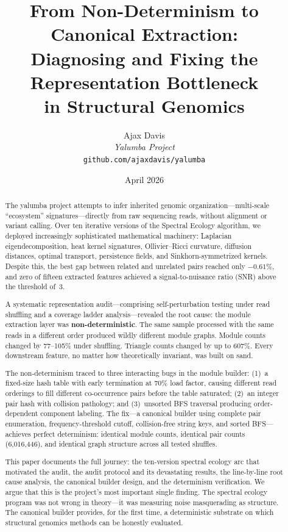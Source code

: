 \documentclass{../yalumba}
\title{From Non-Determinism to Canonical Extraction:\\[0.3em]
Diagnosing and Fixing the Representation Bottleneck\\[0.2em]
in Structural Genomics}
\author{%
  Ajax Davis\\[0.3em]
  \normalsize\textit{Yalumba Project}\\[0.2em]
  \normalsize\texttt{github.com/ajaxdavis/yalumba}%
}
\date{April 2026}
\begin{document}
\maketitle
\thispagestyle{empty}

\begin{abstract}
\noindent
The yalumba project attempts to infer inherited genomic organization---multi-scale
``ecosystem'' signatures---directly from raw sequencing reads, without alignment
or variant calling. Over ten iterative versions of the Spectral Ecology algorithm,
we deployed increasingly sophisticated mathematical machinery: Laplacian
eigendecomposition, heat kernel signatures, Ollivier--Ricci curvature, diffusion
distances, optimal transport, persistence fields, and Sinkhorn-symmetrized kernels.
Despite this, the best gap between related and unrelated pairs reached only
$-0.61\%$, and zero of fifteen extracted features achieved a signal-to-nuisance
ratio (SNR) above the threshold of~3.

A systematic representation audit---comprising self-perturbation testing under
read shuffling and a coverage ladder analysis---revealed the root cause: the
module extraction layer was \textbf{non-deterministic}. The same sample processed
with the same reads in a different order produced wildly different module graphs.
Module counts changed by 77--105\% under shuffling. Triangle counts changed by
up to 607\%. Every downstream feature, no matter how theoretically invariant,
was built on sand.

The non-determinism traced to three interacting bugs in the module builder:
(1)~a fixed-size hash table with early termination at 70\% load factor, causing
different read orderings to fill different co-occurrence pairs before the table
saturated; (2)~an integer pair hash with collision pathology; and (3)~unsorted
BFS traversal producing order-dependent component labeling. The fix---a canonical
builder using complete pair enumeration, frequency-threshold cutoff, collision-free
string keys, and sorted BFS---achieves perfect determinism: identical module counts,
identical pair counts (6,016,446), and identical graph structure across all tested
shuffles.

This paper documents the full journey: the ten-version spectral ecology arc that
motivated the audit, the audit protocol and its devastating results, the line-by-line
root cause analysis, the canonical builder design, and the determinism verification.
We argue that this is the project's most important single finding. The spectral
ecology program was not wrong in theory---it was measuring noise masquerading as
structure. The canonical builder provides, for the first time, a deterministic
substrate on which structural genomics methods can be honestly evaluated.


\end{abstract}
\end{document}
